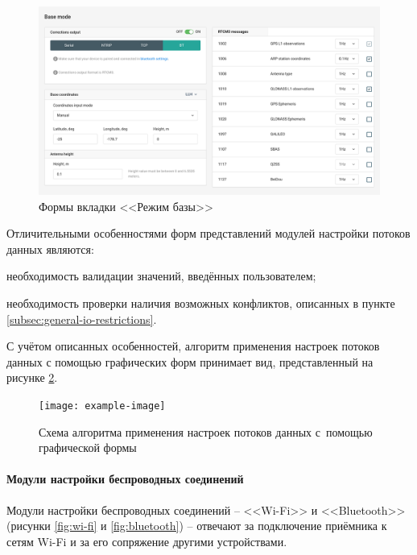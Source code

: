 \begin{figure}[h!]
  \centering
  \setlength{\fboxsep}{5pt}
  \includegraphics[width=.8\textwidth]{img/reachview/base-mode_content_laptop}
  \vspace*{6pt}
  \caption{Формы вкладки <<Режим базы>>}
  \label{fig:base-mode}
\end{figure}

Отличительными особенностями форм представлений модулей настройки потоков данных являются:
\begin{dashitemize}
  \item необходимость валидации значений, введённых пользователем;
  \item необходимость проверки наличия возможных конфликтов, описанных в пункте \ref{subsec:general-io-restrictions}.
\end{dashitemize}

С учётом описанных особенностей, алгоритм применения настроек потоков данных с помощью графических форм принимает вид, представленный на рисунке \ref{fig:io-form-apply}.

\begin{figure}[h!]
  \centering
  \setlength{\fboxsep}{5pt}
  \texttt{[image: example-image]}
  \vspace*{6pt}
  \caption{Схема алгоритма применения настроек потоков данных с~помощью графической формы}
  \label{fig:io-form-apply}
\end{figure}

\paragraph{Модули настройки беспроводных соединений}

Модули настройки беспроводных соединений -- <<Wi-Fi>> и <<Bluetooth>> (рисунки \ref{fig:wi-fi} и \ref{fig:bluetooth}) -- отвечают за подключение приёмника к сетям Wi-Fi и за его сопряжение другими устройствами.

